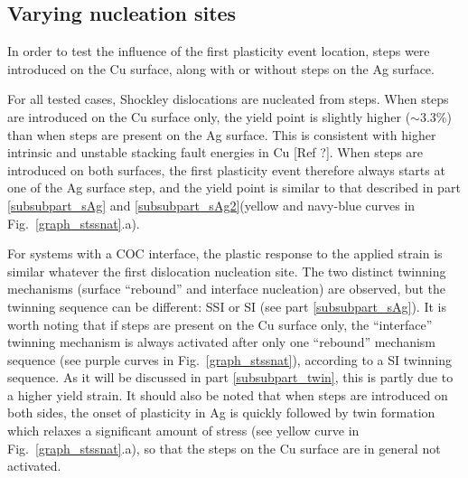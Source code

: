 \documentclass[final,3p,times,twocolumn]{elsarticle}
\begin{document}
 
	\subsection{Varying nucleation sites}\label{subsubpart_comparaison}
	
In order to test the influence of the first plasticity event location, steps were introduced on the Cu surface, along with or without steps on the Ag surface.
	
For all tested cases, Shockley dislocations are nucleated from   steps. When steps are introduced on the Cu surface only, the yield point is slightly higher ($\sim 3.3\%$) than when steps are present on the Ag surface. This is consistent with higher intrinsic and unstable stacking fault energies in Cu [Ref ?]. When steps are introduced on both surfaces, the first plasticity event therefore always starts at one of the Ag surface step, and the yield point is similar to that described in part \ref{subsubpart_sAg} and \ref{subsubpart_sAg2}(yellow and navy-blue curves in Fig.~\ref{graph_stssnat}.a). 

For systems with a COC interface, the plastic response to the applied strain is similar whatever the first dislocation nucleation site. The two distinct twinning mechanisms (surface ``rebound'' and interface nucleation) are observed, but the twinning sequence can be different: SSI or SI (see part \ref{subsubpart_sAg}). 
It is worth noting that if steps are present on the Cu surface only, the ``interface'' twinning mechanism is always activated after only one ``rebound'' mechanism sequence (see purple curves in Fig.~\ref{graph_stssnat}), according to a SI twinning sequence. As it will be discussed in part \ref{subsubpart_twin}, this is partly due to a higher yield strain. It should also be noted that when steps are introduced on both sides, the onset of plasticity in Ag is quickly followed by twin formation which relaxes a significant amount of stress (see yellow curve in Fig.~\ref{graph_stssnat}.a), so that the steps on the Cu surface are in general not activated.
\end{document}
